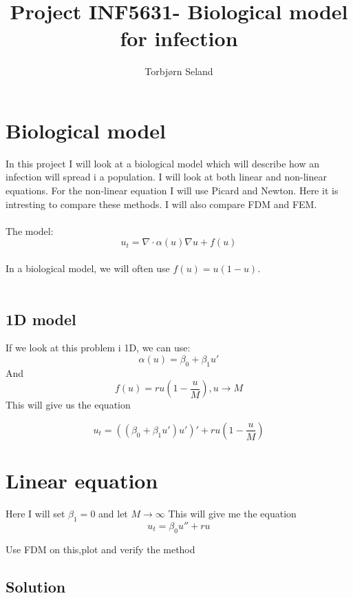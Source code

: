 \documentclass[norsk,11pt.a4paper]{article}
\begin{document}
\title{Project INF5631- Biological model for infection}
\author{Torbjørn Seland}
\maketitle

\section*{Biological model}
In this project I will look at a biological model which will describe how an infection will spread i a population. I will look at both linear and non-linear equations. For the non-linear equation I will use Picard and Newton. Here it is intresting to compare these methods. I will also compare FDM and FEM.\\
\\
The model:
\begin{equation}
u_t = \nabla \cdot \alpha(u)\nabla u + f(u)
\end{equation}
\\
In a biological model, we will often use $f(u)= u(1-u)$. \\
\\
\subsection*{1D model}
If we look at this problem i 1D, we can use:
\begin{equation}
\alpha(u) = \beta_0 + \beta_1 u'
\end{equation}
And
\begin{equation}
f(u) = ru(1-\frac{u}{M}), u\rightarrow M
\end{equation}
This will give us the equation

\begin{equation}
u_t = ((\beta_0 + \beta_1 u')u')' + ru(1-\frac{u}{M})
\end{equation}

\section{Linear equation}
Here I will set $\beta_1 = 0$ and let $M\rightarrow \infty$
This will give me the equation
\begin{equation}
u_t = \beta_0 u'' + ru
\end{equation}

Use FDM on this,plot and verify the method

\subsection*{Solution}
\end{document}
